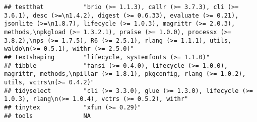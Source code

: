 \documentclass[
]{article}
\begin{document}
\begin{verbatim}
## testthat           "brio (>= 1.1.3), callr (>= 3.7.3), cli (>= 3.6.1), desc (>=\n1.4.2), digest (>= 0.6.33), evaluate (>= 0.21), jsonlite (>=\n1.8.7), lifecycle (>= 1.0.3), magrittr (>= 2.0.3), methods,\npkgload (>= 1.3.2.1), praise (>= 1.0.0), processx (>= 3.8.2),\nps (>= 1.7.5), R6 (>= 2.5.1), rlang (>= 1.1.1), utils, waldo\n(>= 0.5.1), withr (>= 2.5.0)"                                                                                          
## textshaping        "lifecycle, systemfonts (>= 1.1.0)"                                                                                                                                                                                                                                                                                                                                                                                                          
## tibble             "fansi (>= 0.4.0), lifecycle (>= 1.0.0), magrittr, methods,\npillar (>= 1.8.1), pkgconfig, rlang (>= 1.0.2), utils, vctrs\n(>= 0.4.2)"                                                                                                                                                                                                                                                                                                       
## tidyselect         "cli (>= 3.3.0), glue (>= 1.3.0), lifecycle (>= 1.0.3), rlang\n(>= 1.0.4), vctrs (>= 0.5.2), withr"                                                                                                                                                                                                                                                                                                                                          
## tinytex            "xfun (>= 0.29)"                                                                                                                                                                                                                                                                                                                                                                                                                             
## tools              NA                                                                                                                                                                                                                                                                                                                                                                                                                                           

\end{verbatim}
\end{document}
